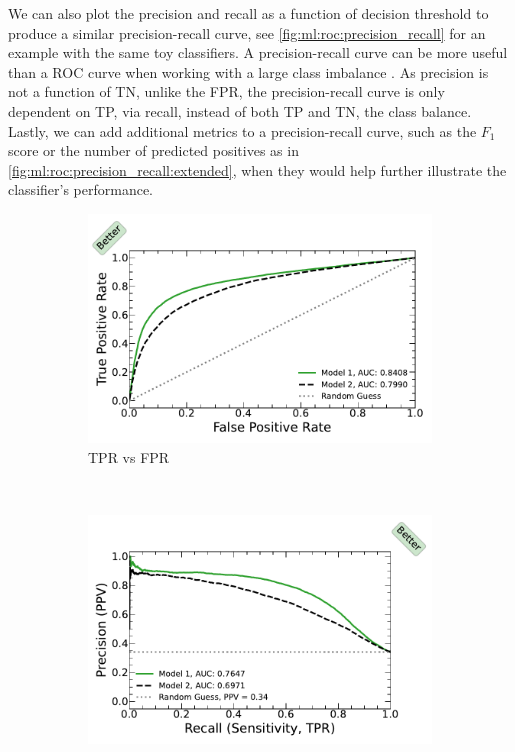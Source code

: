 We can also plot the precision and recall as a function of decision threshold to produce a similar precision-recall curve,
see \cref{fig:ml:roc:precision_recall} for an example with the same toy classifiers.
A precision-recall curve can be more useful than a ROC curve when working with a large class imbalance \cite{10.1371/journal.pone.0118432}.
As precision is not a function of TN, unlike the FPR, the precision-recall curve is only dependent on TP, via recall,
instead of both TP and TN, \ie the class balance.
Lastly, we can add additional metrics to a precision-recall curve,
such as the $F_{1}$ score or the number of predicted positives as in \cref{fig:ml:roc:precision_recall:extended},
when they would help further illustrate the classifier's performance.

\begin{figure}
\centering
  \begin{subfigure}[c]{0.48\textwidth}\centering
  \includegraphics[width=\textwidth,trim={0.18cm 0.3cm 0.18cm 0.3cm},clip]{figures/ml/roc_curves/roc_model_1_model_2}%
  \caption{TPR vs FPR}
  \label{fig:ml:roc:standard}
  \end{subfigure}
  ~
  \begin{subfigure}[c]{0.48\textwidth}\centering
  \includegraphics[width=\textwidth,trim={0.18cm 0.3cm 0.18cm 0.3cm},clip]{figures/ml/roc_curves/roc_precision_recall_model_1_model_2}%

\end{subfigure}
\end{figure}
